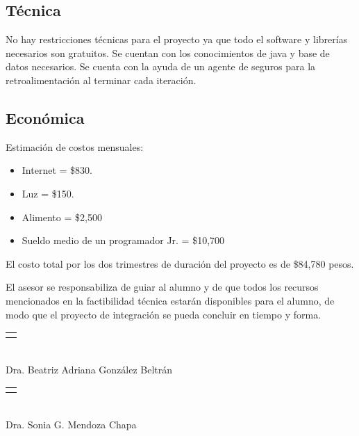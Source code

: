 \subsection*{Técnica}
No hay restricciones técnicas para el proyecto ya que todo el software y librerías necesarios son gratuitos. Se cuentan con los conocimientos de java y base de datos necesarios.
Se cuenta con la ayuda de un agente de seguros para la retroalimentación al terminar cada iteración.

\subsection*{Económica}
Estimación de costos mensuales:

\begin{itemize}
	\item Internet = \$830.
	\item Luz = \$150.
	\item Alimento = \$2,500
	\item Sueldo medio de un programador Jr. = \$10,700
\end{itemize}

El costo total por los dos trimestres de duración del proyecto es de \$84,780 pesos.

El asesor se responsabiliza de guiar al alumno y de que todos los recursos mencionados en la factibilidad técnica estarán disponibles para el alumno, de modo que el proyecto
de integración se pueda concluir en tiempo y forma.

\begin{center}
	\begin{minipage}{0.4\textwidth}
		\centering
		\begin{tabular}{l}
			\makebox[5cm]{\hrulefill}
		\end{tabular}\\
		Dra. Beatriz Adriana González Beltrán%
	\end{minipage}
	\begin{minipage}{0.4\textwidth}
		\centering
		\begin{tabular}{l}
			\makebox[5cm]{\hrulefill}
		\end{tabular}\\
		Dra. Sonia G. Mendoza Chapa%
	\end{minipage}
\end{center}

